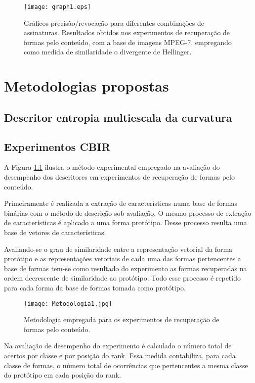 \begin{figure}[h!]
  \caption{\label{fig:graph1} Gráficos precisão/revocação para diferentes combinações de assinaturas. Resultados obtidos nos experimentos de recuperação de formas pelo conteúdo, com a base de imagens MPEG-7, empregando como medida de similaridade o divergente de Hellinger. }
  \centering
  \texttt{[image: graph1.eps]}
\end{figure}

\color{red}
\chapter{Metodologias propostas}

\section{Descritor entropia multiescala da curvatura}


\section{Experimentos CBIR}

A Figura \ref{fig:metodo_cbir} ilustra o método experimental empregado na avaliação do desempenho dos descritores em experimentos de recuperação de formas pelo conteúdo.

Primeiramente é realizada a extração de características numa base de formas binárias com o método de descrição sob avaliação. O mesmo processo de extração de características é aplicado a uma forma protótipo. Desse processo resulta uma base de vetores de características. 

Avaliando-se o grau de similaridade entre a representação vetorial da forma protótipo e as representações vetoriais de cada uma das formas pertencentes a base de formas tem-se como resultado do experimento as formas recuperadas na ordem decrescente de similaridade ao protótipo. Todo esse processo é repetido para cada forma da base de formas tomada como protótipo.

\begin{figure}[h!]
  \caption{\label{fig:metodo_cbir} Metodologia empregada para os experimentos de recuperação de formas pelo conteúdo.}
  \centering
  \texttt{[image: Metodologia1.jpg]}
\end{figure}

Na avaliação de desempenho do experimento é calculado o número total de acertos por classe e por posição do rank. Essa medida contabiliza, para cada classe de formas, o número total de ocorrências que pertencentes a mesma classe do protótipo em cada posição do rank.   



